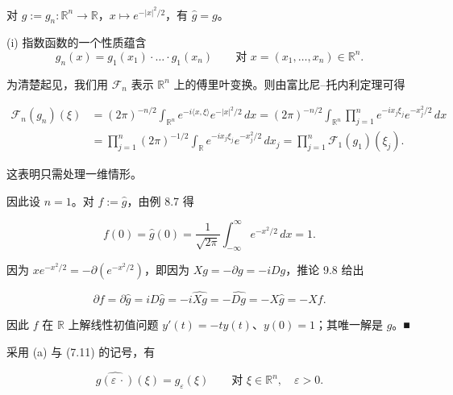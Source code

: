 \begin{example}

\begin{items}
\item

对 $ g := g_n\colon \mathbb{R}^n \to \mathbb{R} $，$ x \mapsto e^{-|x|^2/2} $，有 $ \widehat{g} = g $。

\begin{subitems}
\item

\proofhead
(i) 指数函数的一个性质蕴含
\[
g_n(x) = g_1(x_1)\cdot\ldots\cdot g_1(x_n) \qquad \text{对 } x = (x_1,\ldots,x_n) \in \mathbb{R}^n .
\]

为清楚起见，我们用 $ \mathcal{F}_n $ 表示 $ \mathbb{R}^n $ 上的傅里叶变换。则由富比尼–托内利定理可得

\begin{equation*}
\begin{aligned}
\mathcal{F}_n(g_n)(\xi) &= (2\pi)^{-n/2}\int_{\mathbb{R}^n}e^{-i\langle x,\xi\rangle}e^{-|x|^2/2}\,dx = (2\pi)^{-n/2}\int_{\mathbb{R}^n}\prod_{j=1}^n e^{-ix_j\xi_j}e^{-x_j^2/2}\,dx \\ &= \prod_{j=1}^n(2\pi)^{-1/2}\int_{\mathbb{R}}e^{-ix_j\xi_j}e^{-x_j^2/2}\,dx_j = \prod_{j=1}^n\mathcal{F}_1(g_1)(\xi_j) .
\end{aligned}
\end{equation*}

这表明只需处理一维情形。

\item

因此设 $ n = 1 $。对 $ f := \widehat{g} $，由例 8.7 得

\[
f(0) = \widehat{g}(0) = \frac{1}{\sqrt{2\pi}}\int_{-\infty}^{\infty}e^{-x^2/2}\,dx = 1 .
\]

因为 $ xe^{-x^2/2} = -\partial(e^{-x^2/2}) $，即因为 $ Xg = -\partial g = -iDg $，推论 9.8 给出

\[
\partial f = \partial\widehat{g} = iD\widehat{g} = -i\widehat{Xg} = -\widehat{Dg} = -X\widehat{g} = -Xf .
\]

因此 $ f $ 在 $ \mathbb{R} $ 上解线性初值问题 $ y'(t) = -ty(t) $、$ y(0) = 1 $；其唯一解是 $ g $。\nobreak\hspace{0.35em}■

\end{subitems}

\item

采用 (a) 与 (7.11) 的记号，有

\[
\widehat{g(\varepsilon\,\cdot)}(\xi) = g_\varepsilon(\xi) \qquad \text{对 } \xi \in \mathbb{R}^n, \quad \varepsilon > 0 .
\]


\end{items}
\end{example}
